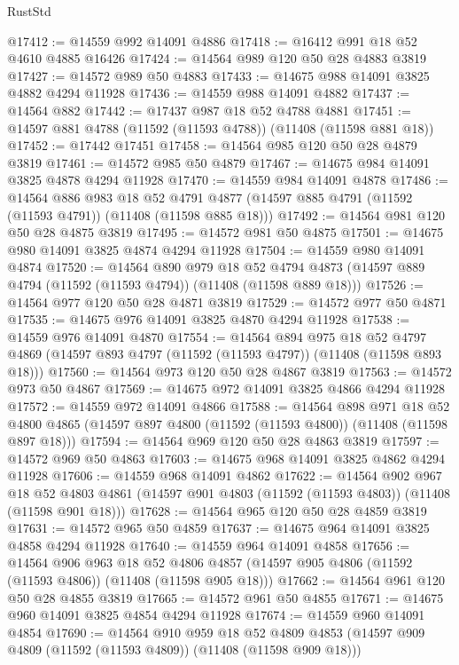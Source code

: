 \begin{lexlean}{RustStd}
\begin{coremodule}
@17412 := @14559 @992 @14091 @4886
@17418 := @16412 @991 @18 @52 @4610 @4885 @16426
@17424 := @14564 @989 @120 @50 @28 @4883 @3819
@17427 := @14572 @989 @50 @4883
@17433 := @14675 @988 @14091 @3825 @4882 @4294 @11928
@17436 := @14559 @988 @14091 @4882
@17437 := @14564 @882
@17442 := @17437 @987 @18 @52 @4788 @4881
@17451 := @14597 @881 @4788 (@11592 (@11593 @4788)) (@11408 (@11598 @881 @18))
@17452 := @17442 @17451
@17458 := @14564 @985 @120 @50 @28 @4879 @3819
@17461 := @14572 @985 @50 @4879
@17467 := @14675 @984 @14091 @3825 @4878 @4294 @11928
@17470 := @14559 @984 @14091 @4878
@17486 := @14564
    @886
    @983
    @18
    @52
    @4791
    @4877
    (@14597 @885 @4791 (@11592 (@11593 @4791)) (@11408 (@11598 @885 @18)))
@17492 := @14564 @981 @120 @50 @28 @4875 @3819
@17495 := @14572 @981 @50 @4875
@17501 := @14675 @980 @14091 @3825 @4874 @4294 @11928
@17504 := @14559 @980 @14091 @4874
@17520 := @14564
    @890
    @979
    @18
    @52
    @4794
    @4873
    (@14597 @889 @4794 (@11592 (@11593 @4794)) (@11408 (@11598 @889 @18)))
@17526 := @14564 @977 @120 @50 @28 @4871 @3819
@17529 := @14572 @977 @50 @4871
@17535 := @14675 @976 @14091 @3825 @4870 @4294 @11928
@17538 := @14559 @976 @14091 @4870
@17554 := @14564
    @894
    @975
    @18
    @52
    @4797
    @4869
    (@14597 @893 @4797 (@11592 (@11593 @4797)) (@11408 (@11598 @893 @18)))
@17560 := @14564 @973 @120 @50 @28 @4867 @3819
@17563 := @14572 @973 @50 @4867
@17569 := @14675 @972 @14091 @3825 @4866 @4294 @11928
@17572 := @14559 @972 @14091 @4866
@17588 := @14564
    @898
    @971
    @18
    @52
    @4800
    @4865
    (@14597 @897 @4800 (@11592 (@11593 @4800)) (@11408 (@11598 @897 @18)))
@17594 := @14564 @969 @120 @50 @28 @4863 @3819
@17597 := @14572 @969 @50 @4863
@17603 := @14675 @968 @14091 @3825 @4862 @4294 @11928
@17606 := @14559 @968 @14091 @4862
@17622 := @14564
    @902
    @967
    @18
    @52
    @4803
    @4861
    (@14597 @901 @4803 (@11592 (@11593 @4803)) (@11408 (@11598 @901 @18)))
@17628 := @14564 @965 @120 @50 @28 @4859 @3819
@17631 := @14572 @965 @50 @4859
@17637 := @14675 @964 @14091 @3825 @4858 @4294 @11928
@17640 := @14559 @964 @14091 @4858
@17656 := @14564
    @906
    @963
    @18
    @52
    @4806
    @4857
    (@14597 @905 @4806 (@11592 (@11593 @4806)) (@11408 (@11598 @905 @18)))
@17662 := @14564 @961 @120 @50 @28 @4855 @3819
@17665 := @14572 @961 @50 @4855
@17671 := @14675 @960 @14091 @3825 @4854 @4294 @11928
@17674 := @14559 @960 @14091 @4854
@17690 := @14564
    @910
    @959
    @18
    @52
    @4809
    @4853
    (@14597 @909 @4809 (@11592 (@11593 @4809)) (@11408 (@11598 @909 @18)))

\end{coremodule}
\end{lexlean}
